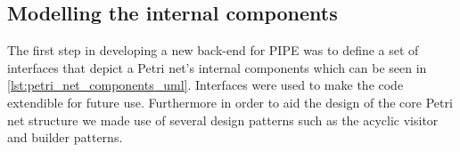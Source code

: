 \subsection{Modelling the internal components}
The first step in developing a new back-end for PIPE was to define a set of interfaces that depict a Petri net's internal components which can be seen in \cref{lst:petri_net_components_uml}. Interfaces were used to make the code extendible for future use. Furthermore in order to aid the design of the core Petri net structure we made use of several design patterns such as the acyclic visitor and builder patterns.
